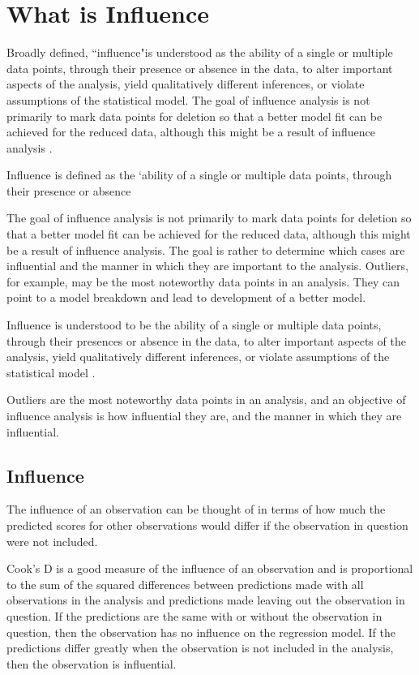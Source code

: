 \documentclass[12pt, a4paper]{article}
\begin{document}
\section{What is Influence} %

Broadly defined, ``influence"is understood as the ability of a single or multiple data points, through their presence or absence in the data, to alter important aspects of the analysis, yield qualitatively different inferences, or violate assumptions of the statistical model. The goal of influence analysis is not primarily to mark data points for deletion so that a better model fit can be achieved for the reduced data, although this might be a result of influence analysis \citep{schabenberger}.

Influence is defined as the `ability of a single or multiple data points, through their presence or absence
	
			
The goal of influence analysis is not primarily to mark data points for deletion so that a better model fit can be achieved for the reduced data, although this might be a result of influence analysis. The goal is rather to determine which cases are influential and the manner in which they are important to the analysis. Outliers, for example, may be the most noteworthy data points in an analysis. They can point to a model breakdown and lead to development of a better model.

Influence is understood to be the ability of a single or multiple data points, through their presences or absence in the data, to
alter important aspects of the analysis, yield qualitatively different inferences, or violate assumptions of the statistical
model \citep{schabenberger}.

Outliers are the most noteworthy data points in an analysis, and an objective of influence analysis is how influential they are,
and the manner in which they are influential.

			
\subsection{Influence}
The influence of an observation can be thought of in terms of how much the predicted scores for other observations would differ if the observation in question were not included. 
			
Cook's D is a good measure of the influence of an observation and is proportional to the sum of the squared differences between predictions made with all observations in the analysis and predictions made leaving out the observation in question. If the predictions are the same with or without the observation in question, then the observation has no influence on the regression model. If the predictions differ greatly when the observation is not included in the analysis, then the observation is influential.
			
\end{document}
